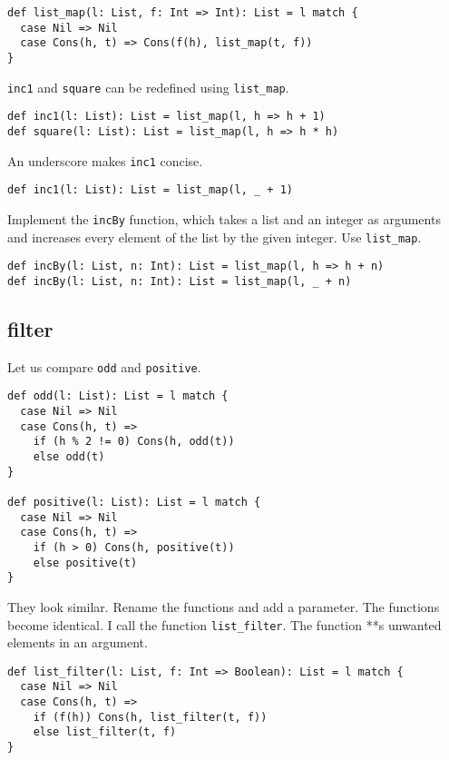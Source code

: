 \begin{verbatim}
def list_map(l: List, f: Int => Int): List = l match {
  case Nil => Nil
  case Cons(h, t) => Cons(f(h), list_map(t, f))
}
\end{verbatim}

\verb!inc1! and \verb!square! can be redefined using \verb!list_map!.

\begin{verbatim}
def inc1(l: List): List = list_map(l, h => h + 1)
def square(l: List): List = list_map(l, h => h * h)
\end{verbatim}

An underscore makes \verb!inc1! concise.

\begin{verbatim}
def inc1(l: List): List = list_map(l, _ + 1)
\end{verbatim}

Implement the \verb!incBy! function, which takes a list and an integer as
arguments and increases every element of the list by the given integer. Use
\verb!list_map!.

\begin{verbatim}
def incBy(l: List, n: Int): List = list_map(l, h => h + n)
def incBy(l: List, n: Int): List = list_map(l, _ + n)
\end{verbatim}

\subsection{filter}

Let us compare \verb!odd! and \verb!positive!.

\begin{verbatim}
def odd(l: List): List = l match {
  case Nil => Nil
  case Cons(h, t) =>
    if (h % 2 != 0) Cons(h, odd(t))
    else odd(t)
}

def positive(l: List): List = l match {
  case Nil => Nil
  case Cons(h, t) =>
    if (h > 0) Cons(h, positive(t))
    else positive(t)
}
\end{verbatim}

They look similar. Rename the functions and add a parameter. The functions become
identical. I call the function \verb!list_filter!. The function **s
unwanted elements in an argument.

\begin{verbatim}
def list_filter(l: List, f: Int => Boolean): List = l match {
  case Nil => Nil
  case Cons(h, t) =>
    if (f(h)) Cons(h, list_filter(t, f))
    else list_filter(t, f)
}
\end{verbatim}

